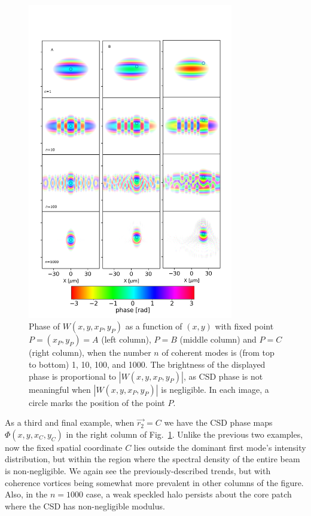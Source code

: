 \documentclass[%
 reprint,
 amsmath,amssymb,
 aps,
]{revtex4-1}
\begin{document}
\begin{figure}
\includegraphics[width=0.8\textwidth, trim=0 3mm 0 20mm,clip]{Figures/vx_id16a_ABC.png}
\caption{Phase of $W(x,y,x_P,y_P)$ as a function of $(x,y)$ with fixed point $P=(x_P,y_P)=A$ (left column), $P=B$ (middle column) and $P=C$ (right column), when the number $n$ of coherent modes is (from top to bottom) 1, 10, 100, and 1000. The brightness of the displayed phase is proportional to $|W(x,y,x_P,y_P)|$, as CSD phase is not meaningful when $|W(x,y,x_P,y_P)|$ is negligible. In each image, a circle marks the position of the point $P$.}
\label{pointP}%
\end{figure}

As a third and final example, when $\vec{r_2}=C$ we have the CSD phase maps $\Phi(x,y,x_C,y_C)$ in the right column of Fig.~\ref{pointP}.  Unlike the previous two examples, now the fixed spatial coordinate $C$ lies outside the dominant first mode's intensity distribution, but within the region where the spectral density of the entire beam is non-negligible.  We again see the previously-described trends, but with coherence vortices being somewhat more prevalent in other columns of the figure.  Also, in the $n=1000$ case, a weak speckled halo persists about the core patch where the CSD has non-negligible modulus.    
\end{document}
